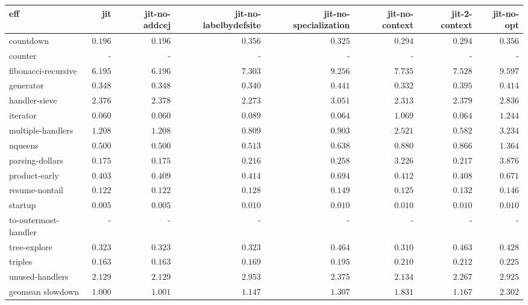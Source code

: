\begin{tabular}{l r r r r r r r}
\toprule eff & jit & jit-no-addcej & jit-no-labelbydefsite & jit-no-specialization & jit-no-context & jit-2-context & jit-no-opt \\
\midrule
countdown & $\mathbf{0.196}$ & $0.196$ & $0.356$ & $0.325$ & $0.294$ & $0.294$ & $0.356$ \\
counter & - & - & - & - & - & - & - \\
fibonacci-recursive & $\mathbf{6.195}$ & $6.196$ & $7.303$ & $9.256$ & $7.735$ & $7.528$ & $9.597$ \\
generator & $0.348$ & $0.348$ & $0.340$ & $0.441$ & $\mathbf{0.332}$ & $0.395$ & $0.414$ \\
handler-sieve & $2.376$ & $2.378$ & $\mathbf{2.273}$ & $3.051$ & $2.313$ & $2.379$ & $2.836$ \\
iterator & $\mathbf{0.060}$ & $0.060$ & $0.089$ & $0.064$ & $1.069$ & $0.064$ & $1.244$ \\
multiple-handlers & $1.208$ & $1.208$ & $0.809$ & $0.903$ & $2.521$ & $\mathbf{0.582}$ & $3.234$ \\
nqueens & $\mathbf{0.500}$ & $0.500$ & $0.513$ & $0.638$ & $0.880$ & $0.866$ & $1.364$ \\
parsing-dollars & $\mathbf{0.175}$ & $0.175$ & $0.216$ & $0.258$ & $3.226$ & $0.217$ & $3.876$ \\
product-early & $\mathbf{0.403}$ & $0.409$ & $0.414$ & $0.694$ & $0.412$ & $0.408$ & $0.671$ \\
resume-nontail & $\mathbf{0.122}$ & $0.122$ & $0.128$ & $0.149$ & $0.125$ & $0.132$ & $0.146$ \\
startup & $\mathbf{0.005}$ & $0.005$ & $0.010$ & $0.010$ & $0.010$ & $0.010$ & $0.010$ \\
to-outermost-handler & - & - & - & - & - & - & - \\
tree-explore & $0.323$ & $0.323$ & $0.323$ & $0.464$ & $\mathbf{0.310}$ & $0.463$ & $0.428$ \\
triples & $\mathbf{0.163}$ & $0.163$ & $0.169$ & $0.195$ & $0.210$ & $0.212$ & $0.225$ \\
unused-handlers & $2.129$ & $\mathbf{2.129}$ & $2.953$ & $2.375$ & $2.134$ & $2.267$ & $2.925$ \\
\midrule
 geomean slowdown & $1.000$ & $1.001$ & $1.147$ & $1.307$ & $1.831$ & $1.167$ & $2.302$ \\
\bottomrule
\end{tabular}
